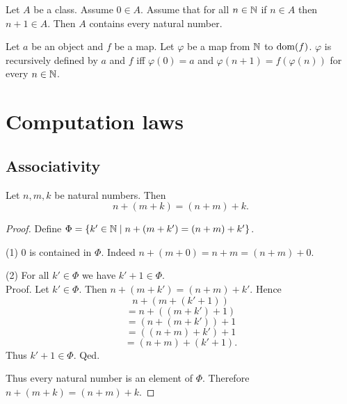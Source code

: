 \documentclass[../arithmetic.tex]{subfiles}
\begin{document}
  \begin{forthel}
    \begin{proposition}[Induction]
      Let $A$ be a class.
      Assume $0 \in A$.
      Assume that for all $n \in \mathbb{N}$ if $n \in A$ then $n \plus 1 \in A$.
      Then $A$ contains every natural number.
    \end{proposition}
  \end{forthel}

  \begin{forthel}
    \begin{proposition}
      Let $a$ be an object and $f$ be a map.
      Let $\varphi$ be a map from $\mathbb{N}$ to $\operatorname{dom}(f)$.
      $\varphi$ is recursively defined by $a$ and $f$ iff $\varphi(0) = a$ and
      $\varphi(n \plus 1) = f(\varphi(n))$ for every $n \in \mathbb{N}$.
    \end{proposition}
  \end{forthel}


  \section{Computation laws}

  \subsection*{Associativity}

  \begin{forthel}
    \begin{proposition}
      Let $n, m, k$ be natural numbers.
      Then \[ n \plus (m \plus k) = (n \plus m) \plus k. \]
    \end{proposition}
    \begin{proof}
      Define $\Phi = \{ k' \in \mathbb{N} \mid n + (m + k') = (n + m) + k' \}$.

      (1) $0$ is contained in $\Phi$.
      Indeed $n \plus (m \plus 0) = n \plus m = (n \plus m) \plus 0$.

      (2) For all $k' \in \Phi$ we have $k' \plus 1 \in \Phi$. \\
      Proof.
        Let $k' \in \Phi$.
        Then $n \plus (m \plus k') = (n \plus m) \plus k'$.
        Hence
        \[  n \plus (m \plus (k' \plus 1))        \]
        \[    = n \plus ((m \plus k') \plus 1)    \]
        \[    = (n \plus (m \plus k')) \plus 1    \]
        \[    = ((n \plus m) \plus k') \plus 1    \]
        \[    = (n \plus m) \plus (k' \plus 1).   \]
        Thus $k' \plus 1 \in \Phi$.
      Qed.

      Thus every natural number is an element of $\Phi$.
      Therefore $n \plus (m \plus k) = (n \plus m) \plus k$.
    \end{proof}
  \end{forthel}
\end{document}
